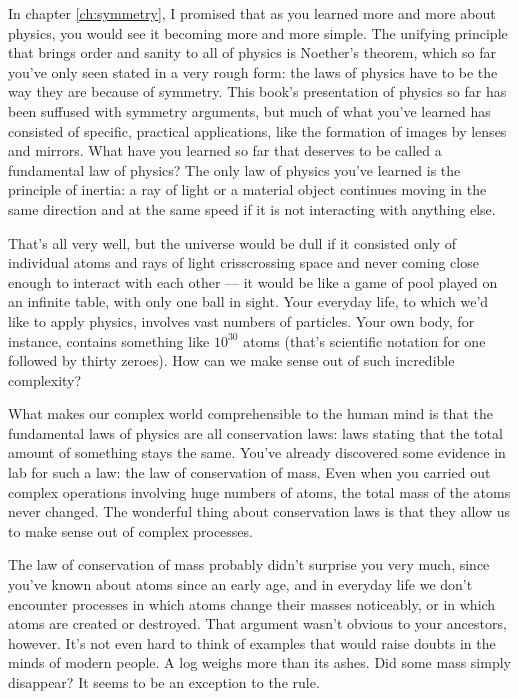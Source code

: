 \label{ch:energy}
In chapter \ref{ch:symmetry}, I promised that as you learned more and more about physics,
you would see it becoming more and more simple. The unifying principle that brings order and
sanity to all of physics is Noether's theorem, which so far you've only seen stated in a very
rough form: the laws of physics have to be the way they are because of symmetry. This book's presentation of
physics so far has been suffused with symmetry arguments, but much of what you've learned has
consisted of specific, practical applications, like the formation of images by lenses and mirrors.
What have you learned so far that deserves to be called a fundamental law of physics? The only
law of physics you've learned is the principle of inertia:
a ray of light or a material object continues moving in the same direction and
at the same speed if it is not interacting with anything else.

That's all very well, but the universe would be dull if it consisted only of individual
atoms and rays of light crisscrossing space and never coming close enough to interact with each
other --- it would be like a game of pool played on an infinite table, with only one ball in
sight. Your everyday life, to which we'd like to apply physics, involves vast numbers of
particles. Your own body, for instance, contains something like $10^{30}$ atoms (that's
scientific notation for one followed by thirty zeroes). How can we make sense out of
such incredible complexity?

What makes our complex world comprehensible to the human mind is that the fundamental
laws of physics are all conservation laws: laws stating that the total amount of something
stays the same. You've already discovered some evidence in lab for such a law: the law of
conservation of mass. Even when you carried out complex operations involving huge numbers
of atoms, the total mass of the atoms never changed. The wonderful thing about
conservation laws is that they allow us to make sense out of complex processes.

The law of
conservation of mass probably didn't surprise you very much, since you've known about
atoms since an early age, and in everyday life we don't encounter processes in which atoms
change their masses noticeably, or in which atoms are created or destroyed. That argument wasn't
obvious to your ancestors, however. 
It's not even hard to think of examples that would raise doubts in the minds of modern people.
A log weighs more than its
ashes. Did some mass simply disappear? It seems to be an exception to the rule.

